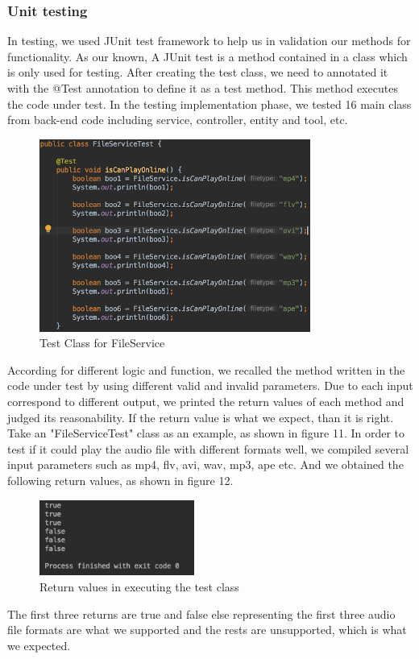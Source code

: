\documentclass[12pt,a4]{article}
\begin{document}
\subsubsection{Unit testing}\label{4.4.1}
In testing, we used JUnit test framework to help us in validation our methods for functionality. As our known, A JUnit test is a method contained in a class which is only used for testing. After creating the test class, we need to annotated it with the @Test annotation to define it as a test method. This method executes the code under test. In the testing implementation phase, we tested 16 main class from back-end code including service, controller, entity and tool, etc. 
\begin{figure}[h]%
		\centering  %
		\includegraphics[width=3.5in]{figure/n}  	%
		\caption{Test Class for FileService}   %
		\end{figure}
According for different logic and function, we recalled the method written in the code under test by using different valid and invalid parameters. Due to each input correspond to different output, we printed the return values of each method and judged its reasonability. If the return value is what we expect, than it is right. Take an "FileServiceTest" class as an example, as shown in figure 11.
In order to test if it could play the audio file with different formats well, we compiled several input parameters such as mp4, flv, avi, wav, mp3, ape etc. And we obtained the following return values, as shown in figure 12. 
\begin{figure}[h]%
		\centering  %
		\includegraphics[width=2in]{figure/n1}  	%
		\caption{Return values in executing the test class}   %
		\end{figure}
The first three returns are true and false else representing the first three audio file formats are what we supported and the rests are unsupported, which is what we expected.
\end{document}
